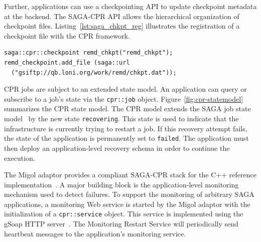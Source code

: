 \documentclass{rspublic}
\begin{document}
Further, applications can use a checkpointing API to update checkpoint
metadata at the backend. The SAGA-CPR API allows the hierarchical
organization of checkpoint files.
Listing~\ref{lst:saga_chkpt_reg} illustrates 
the registration of a checkpoint file with the CPR framework.     
\begin{lstlisting}[style=myListing, caption={\footnotesize \bf SAGA-CPR: Checkpoint Registration}, float=t, label={lst:saga_chkpt_reg}]
saga::cpr::checkpoint remd_chkpt("remd_chkpt");
remd_checkpoint.add_file (saga::url 
  ("gsiftp://qb.loni.org/work/remd/chkpt.dat"));
\end{lstlisting}

CPR jobs are subject to an extended state model. An application can
query or subscribe to a job's state via the \texttt{cpr::job} object.
Figure~\ref{fig:cpr-statemodel} summarizes the CPR state model. The
CPR model extends the SAGA job state model~\cite{saga_gfd90} by the
new state \texttt{recovering}. This state is used to indicate that the
infrastructure is currently trying to restart a job.  If this recovery
attempt fails, the state of the application is permanently set to
\texttt{failed}.  The application must then deploy an
application-level recovery schema in order to continue the execution.


The Migol adaptor provides a compliant SAGA-CPR stack for the C++
reference implementation~\cite{Kaiser:2006qp}.  A major building block
is the application-level monitoring mechanism used to detect failures.
To support the monitoring of arbitrary SAGA applications, a monitoring
Web service is started by the Migol adaptor with the initialization of
a \texttt{cpr::service} object. This service is implemented using the
gSoap HTTP server~\cite{gsoap}.  The Monitoring Restart Service will
periodically send heartbeat messages to the application's monitoring
service.

\end{document}

